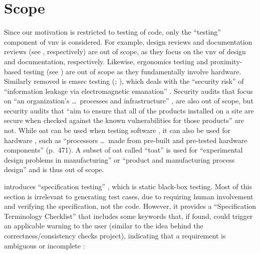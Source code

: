 \section{Scope}
\label{scope}

Since our motivation is restricted to testing of code, only the ``testing''
component of \acf{vnv} is considered.
For example, design reviews and documentation reviews
\ifnotpaper \citep[see][pp.~132, 144, respectively]{IEEE2017}
\else (see \cite[pp.~132, 144]{IEEE2017}, respectively) \fi
are out of scope, as they focus on the \acs{vnv} of design and documentation,
respectively. Likewise, ergonomics testing
and proximity-based testing (see \citealpISTQB{}) are out of scope as they
fundamentally involve hardware.
\ifnotpaper
      Similarly removed is \acf{emsec} testing
      (\citealp{ISO2021}; \citealp[p.~95]{ZhouEtAl2012}), which deals with the
      ``security risk'' of ``information leakage via electromagnetic emanation''
      \citep[p.~95]{ZhouEtAl2012}.
\fi Security audits that focus on ``an organization's
\dots\ processes and infrastructure'' \citepISTQB{}, are also out of scope,
but security audits that ``aim to ensure that all of the products installed on
a site are secure when checked against the known vulnerabilities for those
products'' \citep[p.~28]{Gerrard2000b} are not.
\ifnotpaper While \acf{oat}
      can be used when testing software \citep{Mandl1985}, it can also be used for
      hardware \citep[pp.~471-472]{Valcheva2013}, such as ``processors \dots\ made
      from pre-built and pre-tested hardware components'' (p.~471). A subset of
      \acs{oat} called ``\acf{toat}'' is used for ``experimental design problems in
      manufacturing'' \citep[p.~1573]{YuEtAl2011} or ``product and manufacturing
      process design'' \cite[p.~44]{Tsui2007} and is thus out of scope.

      \citeauthor{Patton2006} introduces ``specification testing''
      \citeyearpar[pp.~56-62]{Patton2006}, which is static black-box testing.
      Most of this section is irrelevant to generating test cases, due to
      requiring human involvement and verifying the specification, not the code.
      However, it provides a ``Specification Terminology Checklist''
      \citep[p.~61]{Patton2006} that includes some keywords that, if found, could
      trigger an applicable warning to the user (similar to the idea behind the
      correctness/consistency checks project), indicating that a requirement is
      ambiguous or incomplete \citep[see][p.~1-8]{SWEBOK2024}:

